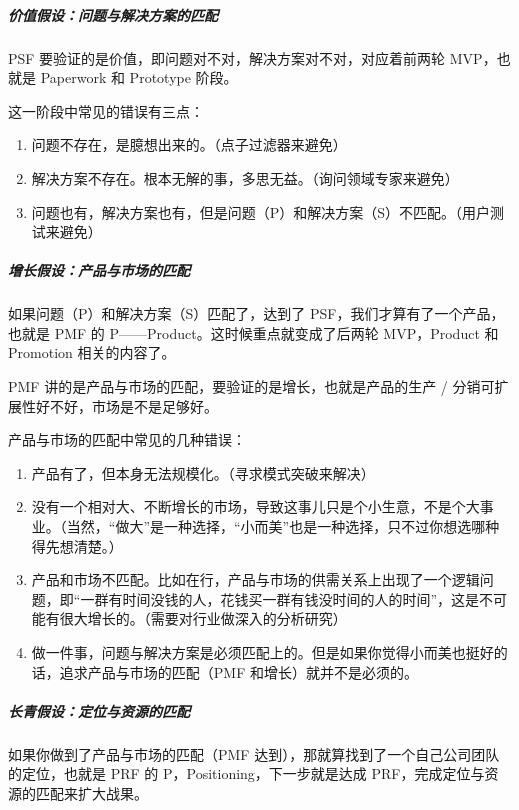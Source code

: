 \documentclass[letterpaper,10pt,english]{sphinxmanual}
\begin{document}
\subparagraph{价值假设：问题与解决方案的匹配}
\label{\detokenize{chapter_introduction/Product:id38}}
PSF 要验证的是价值，即问题对不对，解决方案对不对，对应着前两轮
MVP，也就是 Paperwork 和 Prototype 阶段。

这一阶段中常见的错误有三点：
\begin{enumerate}
%
\item {} 
问题不存在，是臆想出来的。（点子过滤器来避免）

\item {} 
解决方案不存在。根本无解的事，多思无益。（询问领域专家来避免）

\item {} 
问题也有，解决方案也有，但是问题（P）和解决方案（S）不匹配。（用户测试来避免）

\end{enumerate}


\subparagraph{增长假设：产品与市场的匹配}
\label{\detokenize{chapter_introduction/Product:id39}}
如果问题（P）和解决方案（S）匹配了，达到了
PSF，我们才算有了一个产品，也就是 PMF 的
P——Product。这时候重点就变成了后两轮 MVP，Product 和 Promotion
相关的内容了。

PMF 讲的是产品与市场的匹配，要验证的是增长，也就是产品的生产 /
分销可扩展性好不好，市场是不是足够好。

产品与市场的匹配中常见的几种错误：
\begin{enumerate}
%
\item {} 
产品有了，但本身无法规模化。（寻求模式突破来解决）

\item {} 
没有一个相对大、不断增长的市场，导致这事儿只是个小生意，不是个大事业。（当然，“做大”是一种选择，“小而美”也是一种选择，只不过你想选哪种得先想清楚。）

\item {} 
产品和市场不匹配。比如在行，产品与市场的供需关系上出现了一个逻辑问题，即“一群有时间没钱的人，花钱买一群有钱没时间的人的时间”，这是不可能有很大增长的。（需要对行业做深入的分析研究）

\item {} 
做一件事，问题与解决方案是必须匹配上的。但是如果你觉得小而美也挺好的话，追求产品与市场的匹配（PMF
和增长）就并不是必须的。

\end{enumerate}


\subparagraph{长青假设：定位与资源的匹配}
\label{\detokenize{chapter_introduction/Product:id40}}
如果你做到了产品与市场的匹配（PMF
达到），那就算找到了一个自己公司团队的定位，也就是 PRF 的
P，Positioning，下一步就是达成 PRF，完成定位与资源的匹配来扩大战果。
\end{document}
